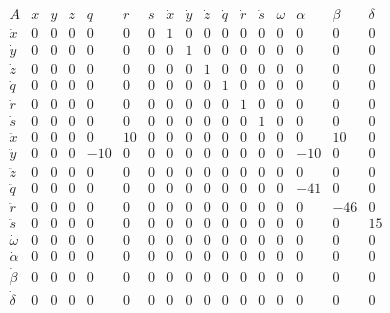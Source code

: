 $$ \begin{array}{ccccccccccccccccc} A& x& y& z& q& r& s& \dot{x}& \dot{y}& \dot{z}& \dot{q}& \dot{r}& \dot{s}& \omega& \alpha& \beta& \delta\\
    \dot{x}& 0& 0& 0& 0& 0& 0& 1& 0& 0& 0& 0& 0& 0& 0& 0& 0\\ \dot{y}& 0& 0& 0& 0& 0& 0& 0& 1& 0& 0& 0& 0& 0& 0& 0& 0\\ \dot{z}& 0& 0& 0& 0& 0& 0&
    0& 0& 1& 0& 0& 0& 0& 0& 0& 0\\ \dot{q}& 0& 0& 0& 0& 0& 0& 0& 0& 0& 1& 0& 0& 0& 0& 0& 0\\ \dot{r}& 0& 0& 0& 0& 0& 0& 0& 0& 0& 0& 1& 0& 0& 0& 0&
    0\\ \dot{s}& 0& 0& 0& 0& 0& 0& 0& 0& 0& 0& 0& 1& 0& 0& 0& 0\\ \ddot{x}& 0& 0& 0& 0& 10& 0& 0& 0& 0& 0& 0& 0& 0& 0& 10& 0\\ \ddot{y}& 0& 0& 0&
    -10& 0& 0& 0& 0& 0& 0& 0& 0& 0& -10& 0& 0\\ \ddot{z}& 0& 0& 0& 0& 0& 0& 0& 0& 0& 0& 0& 0& 0& 0& 0& 0\\ \ddot{q}& 0& 0& 0& 0& 0& 0& 0& 0& 0& 0&
    0& 0& 0& -41& 0& 0\\ \ddot{r}& 0& 0& 0& 0& 0& 0& 0& 0& 0& 0& 0& 0& 0& 0& -46& 0\\ \ddot{s}& 0& 0& 0& 0& 0& 0& 0& 0& 0& 0& 0& 0& 0& 0& 0& 15\\
    \dot{\omega}& 0& 0& 0& 0& 0& 0& 0& 0& 0& 0& 0& 0& 0& 0& 0& 0\\ \dot{\alpha}& 0& 0& 0& 0& 0& 0& 0& 0& 0& 0& 0& 0& 0& 0& 0& 0\\ \dot{\beta}& 0&
    0& 0& 0& 0& 0& 0& 0& 0& 0& 0& 0& 0& 0& 0& 0\\ \dot{\delta}& 0& 0& 0& 0& 0& 0& 0& 0& 0& 0& 0& 0& 0& 0& 0& 0\\ \end{array}
$$